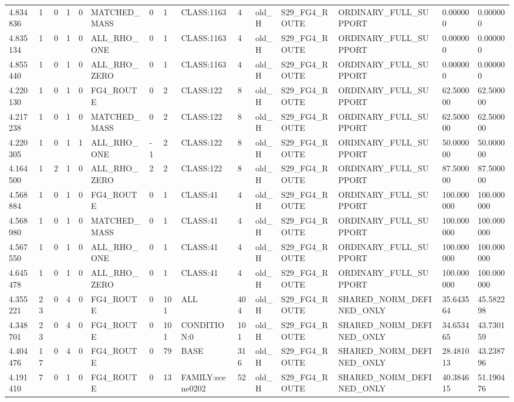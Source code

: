\begin{tabular}{lllllllllllllll}
4.834836 & 1 & 0 & 1 & 0 & MATCHED\_MASS & 0 & 1 & CLASS:1163 & 4 & old\_H & S29\_FG4\_ROUTE & ORDINARY\_FULL\_SUPPORT & 0.000000 & 0.000000 \\
4.835134 & 1 & 0 & 1 & 0 & ALL\_RHO\_ONE & 0 & 1 & CLASS:1163 & 4 & old\_H & S29\_FG4\_ROUTE & ORDINARY\_FULL\_SUPPORT & 0.000000 & 0.000000 \\
4.855440 & 1 & 0 & 1 & 0 & ALL\_RHO\_ZERO & 0 & 1 & CLASS:1163 & 4 & old\_H & S29\_FG4\_ROUTE & ORDINARY\_FULL\_SUPPORT & 0.000000 & 0.000000 \\
4.220130 & 1 & 0 & 1 & 0 & FG4\_ROUTE & 0 & 2 & CLASS:122 & 8 & old\_H & S29\_FG4\_ROUTE & ORDINARY\_FULL\_SUPPORT & 62.500000 & 62.500000 \\
4.217238 & 1 & 0 & 1 & 0 & MATCHED\_MASS & 0 & 2 & CLASS:122 & 8 & old\_H & S29\_FG4\_ROUTE & ORDINARY\_FULL\_SUPPORT & 62.500000 & 62.500000 \\
4.220305 & 1 & 0 & 1 & 1 & ALL\_RHO\_ONE & -1 & 2 & CLASS:122 & 8 & old\_H & S29\_FG4\_ROUTE & ORDINARY\_FULL\_SUPPORT & 50.000000 & 50.000000 \\
4.164500 & 1 & 2 & 1 & 0 & ALL\_RHO\_ZERO & 2 & 2 & CLASS:122 & 8 & old\_H & S29\_FG4\_ROUTE & ORDINARY\_FULL\_SUPPORT & 87.500000 & 87.500000 \\
4.568884 & 1 & 0 & 1 & 0 & FG4\_ROUTE & 0 & 1 & CLASS:41 & 4 & old\_H & S29\_FG4\_ROUTE & ORDINARY\_FULL\_SUPPORT & 100.000000 & 100.000000 \\
4.568980 & 1 & 0 & 1 & 0 & MATCHED\_MASS & 0 & 1 & CLASS:41 & 4 & old\_H & S29\_FG4\_ROUTE & ORDINARY\_FULL\_SUPPORT & 100.000000 & 100.000000 \\
4.567550 & 1 & 0 & 1 & 0 & ALL\_RHO\_ONE & 0 & 1 & CLASS:41 & 4 & old\_H & S29\_FG4\_ROUTE & ORDINARY\_FULL\_SUPPORT & 100.000000 & 100.000000 \\
4.645478 & 1 & 0 & 1 & 0 & ALL\_RHO\_ZERO & 0 & 1 & CLASS:41 & 4 & old\_H & S29\_FG4\_ROUTE & ORDINARY\_FULL\_SUPPORT & 100.000000 & 100.000000 \\
4.355221 & 23 & 0 & 4 & 0 & FG4\_ROUTE & 0 & 101 & ALL & 404 & old\_H & S29\_FG4\_ROUTE & SHARED\_NORM\_DEFINED\_ONLY & 35.643564 & 45.582298 \\
4.348701 & 23 & 0 & 4 & 0 & FG4\_ROUTE & 0 & 101 & CONDITION:0 & 101 & old\_H & S29\_FG4\_ROUTE & SHARED\_NORM\_DEFINED\_ONLY & 34.653465 & 43.730159 \\
4.404476 & 17 & 0 & 4 & 0 & FG4\_ROUTE & 0 & 79 & BASE & 316 & old\_H & S29\_FG4\_ROUTE & SHARED\_NORM\_DEFINED\_ONLY & 28.481013 & 43.238796 \\
4.191410 & 7 & 0 & 1 & 0 & FG4\_ROUTE & 0 & 13 & FAMILY:scene0202 & 52 & old\_H & S29\_FG4\_ROUTE & SHARED\_NORM\_DEFINED\_ONLY & 40.384615 & 51.190476 \\

\end{tabular}
